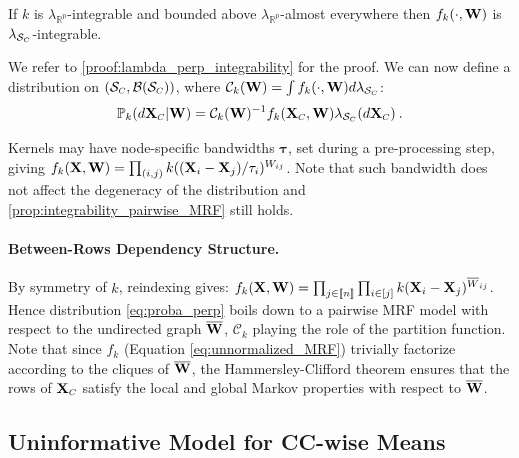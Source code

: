 \begin{theorem}\label{prop:integrability_pairwise_MRF}
If $k$ is $\lambda_{\mathbb{R}^p}$-integrable and bounded above $\lambda_{\mathbb{R}^p}$-almost everywhere then $f_{k}(\cdot, \mathbf{W})$ is $\lambda_{\mathcal{S}_{\scaleto{C}{3pt}}}$-integrable.
\end{theorem}

We refer to \cref{proof:lambda_perp_integrability} for the proof.
We can now define a distribution on $(\mathcal{S}_{\scaleto{C}{4pt}}, \mathcal{B}(\mathcal{S}_{\scaleto{C}{4pt}}))$, where $\mathcal{C}_{k}(\Wb) = \int f_{k}(\cdot, \Wb) d\lambda_{\mathcal{S}_{\scaleto{C}{3pt}}}$:
\begin{align}\label{eq:proba_perp}
\mathbb{P}_{k}(d\Xb_{\scaleto{C}{4pt}} | \Wb) = \mathcal{C}_{k}(\Wb)^{-1} f_{k}(\Xb_{\scaleto{C}{4pt}}, \Wb) \lambda_{\mathcal{S}_{\scaleto{C}{3pt}}}(d\Xb_{\scaleto{C}{4pt}}) \: .
\end{align}

\begin{remark}
Kernels may have node-specific bandwidths $\bm{\tau}$, set during a pre-processing step, giving $f_{k}(\mathbf{X},\mathbf{W}) = \prod_{(i,j)} k((\mathbf{X}_{i} - \mathbf{X}_{j})/\tau_{i})^{W_{ij}}$. Note that such bandwidth does not affect the degeneracy of the distribution and \cref{prop:integrability_pairwise_MRF} still holds.
\end{remark}


\paragraph{Between-Rows Dependency Structure.} By symmetry of $k$, reindexing gives: $f_{k}(\mathbf{X}, \mathbf{W}) = \prod_{j \in {[\![n]\!]}} \prod_{i \in [j]} k(\mathbf{X}_{i} - \mathbf{X}_{j})^{\overline{W}_{ij}}$. Hence distribution \eqref{eq:proba_perp} boils down to a pairwise MRF model \citep{clifford1990markov} with respect to the undirected graph $\overline{\mathbf{W}}$, $\mathcal{C}_{k}$ playing the role of the partition function. Note that since $f_k$ (Equation \ref{eq:unnormalized_MRF}) trivially factorize according to the cliques of $\overline{\mathbf{W}}$, the Hammersley-Clifford theorem ensures that the rows of $\Xb_{\scaleto{C}{4pt}}$ satisfy the local and global Markov properties with respect to $\overline{\mathbf{W}}$. 

\subsection{Uninformative Model for CC-wise Means}

